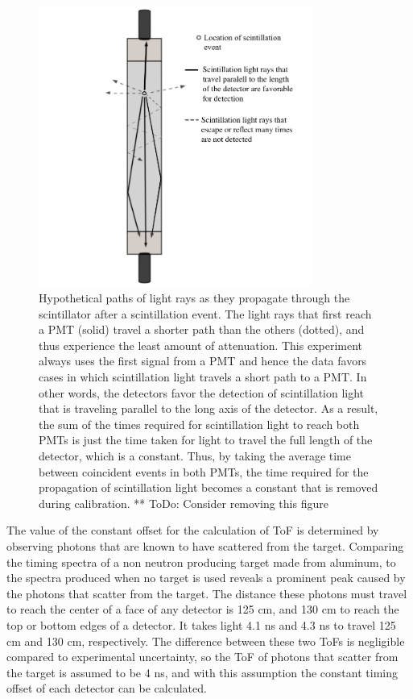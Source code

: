\begin{figure}
    \centering
    \includegraphics[width = 0.8\textwidth]{Content/Methods/lightpaths.png}
    
    \caption{Hypothetical paths of light rays as they propagate through the scintillator after a scintillation event.
    The light rays that first reach a PMT (solid) travel a shorter path than the others (dotted), and thus experience the least amount of attenuation.
    This experiment always uses the first signal from a PMT and hence the data favors cases in which scintillation light travels a short path to a PMT.
    In other words, the detectors favor the detection of scintillation light that is traveling parallel to the long axis of the detector.
    As a result, the sum of the times required for scintillation light to reach both PMTs is just the time taken for light to travel the full length of the detector, which is a constant.
    Thus, by taking the average time between coincident events in both PMTs, the time required for the propagation of scintillation light becomes a constant that is removed during calibration.
    ** ToDo: Consider removing this figure  }
    \label{fig:lightpath}
\end{figure}

The value of the constant offset for the calculation of ToF is determined by observing photons that are known to have scattered from the target.
Comparing the timing spectra of a non neutron producing target made from aluminum, to the spectra produced when no target is used reveals a prominent peak caused by the photons that scatter from the target.
The distance these photons must travel to reach the center of a face of any detector is 125 cm, and 130 cm to reach the top or bottom edges of a detector.
It takes light 4.1 ns and 4.3 ns to travel 125 cm and 130 cm, respectively.
The difference between these two ToFs is negligible compared to experimental uncertainty, so the ToF of photons that scatter from the target is assumed to be 4 ns, and with this assumption the constant timing offset of each detector can be calculated.
   
